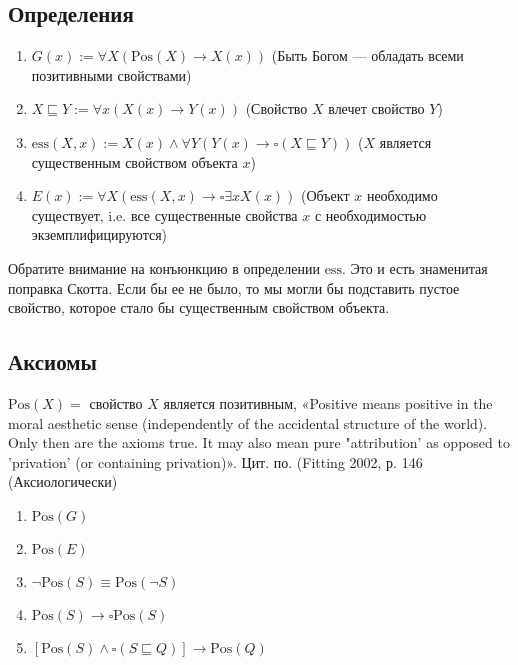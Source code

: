 \documentclass[openany]{book}
\theoremstyle{plain}
\theoremstyle{definition}
\begin{document}
\subsection{Определения}
\begin{enumerate}
    \item \(G(x) := \forall X (\mathrm{Pos}(X) \rightarrow X(x))\) (Быть Богом --- обладать всеми позитивными свойствами)
    \item \(X \sqsubseteq Y := \forall x (X(x) \rightarrow Y(x))\) (Свойство \(X\) влечет свойство \(Y\))
    \item \(\mathrm{ess}(X, x) := X(x) \land \forall Y (Y(x) \rightarrow \square (X \sqsubseteq Y))\) (\(X\) является существенным свойством объекта \(x\))
    \item \(E(x) := \forall X (\mathrm{ess}(X, x) \rightarrow \square \exists x X(x))\) (Объект \(x\) необходимо существует, i.e. все существенные свойства \(x\) с необходимостью экземплифицируются)
\end{enumerate}

Обратите внимание на конъюнкцию в определении \(\mathrm{ess}\). Это и есть знаменитая поправка Скотта. Если бы ее не было, то мы могли бы подставить пустое свойство, которое стало бы существенным  свойством объекта.

\subsection{Аксиомы}

\(\mathrm{Pos}(X) =\) свойство \(X\) является позитивным,
«Positive means positive in the moral aesthetic sense (independently of the accidental structure of the world). Only then are the axioms true. It may also mean pure "attribution' as opposed to 'privation' (or containing privation)». Цит. по. (Fitting 2002, р. 146 (Аксиологически)

\begin{enumerate}
    \item \(\mathrm{Pos}(G)\)

    \item \(\mathrm{Pos}(E)\)

    \item \(\neg \mathrm{Pos}(S) \equiv \mathrm{Pos}(\neg S)\)
    \item \(\mathrm{Pos}(S) \to \square \mathrm{Pos}(S)\)
    \item \([\mathrm{Pos}(S) \land \square (S \sqsubseteq Q)] \to \mathrm{Pos}(Q)\)
\end{enumerate}
\end{document}
